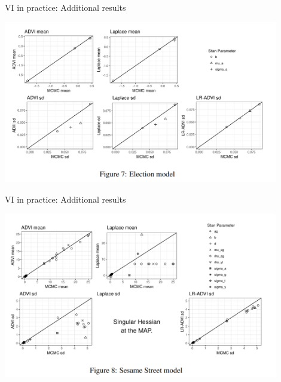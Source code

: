 \begin{frame}{VI in practice: Additional results}

\begin{center}
\includegraphics[width=0.9\textwidth]{static_images/Election_model.png}
\end{center}

\end{frame}



\begin{frame}{VI in practice: Additional results}

\begin{center}
\includegraphics[width=0.9\textwidth]{static_images/Sesame_model.png}
\end{center}

\end{frame}



